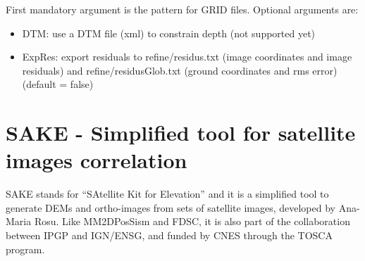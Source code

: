 First mandatory argument is the pattern for GRID files. Optional arguments are:
\begin{itemize}
\item DTM: use a DTM file (xml) to constrain depth (not supported yet)
\item ExpRes: export residuals to refine/residus.txt (image coordinates and image residuals) and refine/residusGlob.txt (ground coordinates and rms error) (default = false)
\end{itemize}

\section{SAKE - Simplified tool for satellite images correlation}

SAKE stands for ``SAtellite Kit for Elevation'' and it is a simplified tool to generate DEMs and ortho-images from sets of satellite images, developed by Ana-Maria Rosu. Like MM2DPosSism and FDSC, it is also part of the collaboration between IPGP and IGN/ENSG, and funded by CNES through the TOSCA program. 

